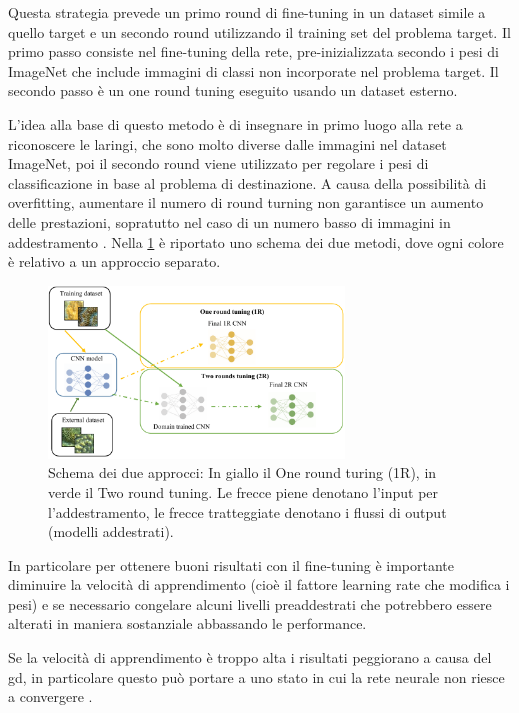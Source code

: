 Questa strategia prevede un primo round di fine-tuning in un dataset simile a quello target e un secondo round utilizzando il training set del problema target. Il primo passo consiste nel fine-tuning della rete, pre-inizializzata secondo i pesi di ImageNet che include immagini di classi non incorporate nel problema target. Il secondo passo è un one round tuning eseguito usando un  dataset esterno. 

L'idea alla base di questo metodo è di insegnare in primo luogo alla rete a riconoscere le laringi, che sono molto diverse dalle immagini nel dataset ImageNet, poi il secondo round viene utilizzato per regolare i pesi di classificazione in base al problema di destinazione. A causa della possibilità di \gls{overfitting}, aumentare il numero di round turning non garantisce un aumento delle prestazioni, sopratutto nel caso di un numero basso di immagini in addestramento \cite{lumini_plankton}. Nella \cref{fig:tl_2rt}  è riportato uno schema dei due metodi, dove ogni colore è relativo a un approccio separato. 

\begin{figure}[ht]
    \centering
    \includegraphics[width=0.7\textwidth]{transfer-learning/tl_2rt.pdf}
    \caption[Schema dei due approcci: In giallo il One round turing (1R), in verde il Two round tuning]{Schema dei due approcci: In giallo il One round turing (1R), in verde il Two round tuning. Le frecce piene denotano l'input per l'addestramento, le frecce tratteggiate denotano i flussi di output (modelli addestrati).}
    \label{fig:tl_2rt}
\end{figure}

In particolare per ottenere buoni risultati con il fine-tuning è importante diminuire la velocità di apprendimento (cioè il fattore learning rate che modifica i pesi) e se necessario congelare alcuni livelli preaddestrati che potrebbero essere alterati in maniera sostanziale abbassando le performance.

Se la velocità di apprendimento è troppo alta i risultati peggiorano a causa del \gls{gd}, in particolare questo può portare a uno stato in cui la rete neurale non riesce a convergere \cite{joel_ft_tl_lfs} \cite{joel_tl}.

